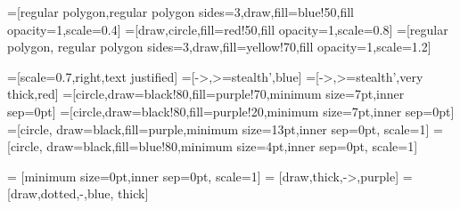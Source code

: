 =[regular polygon,regular polygon sides=3,draw,fill=blue!50,fill opacity=1,scale=0.4]
=[draw,circle,fill=red!50,fill opacity=1,scale=0.8]
=[regular polygon, regular polygon sides=3,draw,fill=yellow!70,fill opacity=1,scale=1.2]

=[scale=0.7,right,text justified]
=[->,>=stealth',blue]
=[->,>=stealth',very thick,red]
	=[circle,draw=black!80,fill=purple!70,minimum size=7pt,inner sep=0pt]
	=[circle,draw=black!80,fill=purple!20,minimum size=7pt,inner sep=0pt]
			=[circle, draw=black,fill=purple,minimum size=13pt,inner sep=0pt, scale=1]
		=[circle, draw=black,fill=blue!80,minimum size=4pt,inner sep=0pt, scale=1]

		= [minimum size=0pt,inner sep=0pt, scale=1]
 	= [draw,thick,->,purple]
 	= [draw,dotted,-,blue, thick]

\newcommand{\nb}[3]{
	{\colorbox{#2}{\bfseries\sffamily\scriptsize\textcolor{white}{#1}}}
	{\textcolor{#2}{\sf\small$\blacktriangleright$\textit{#3}$\blacktriangleleft$}}}

\newcommand{\OP}[1]{\nb{OP}{brown}{#1}}
\newcommand{\GM}[1]{\nb{TM}{orange}{#1}}

